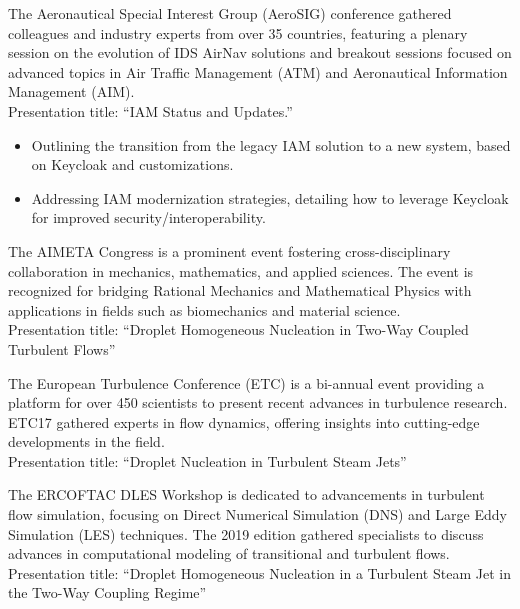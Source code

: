 	\newline
	The Aeronautical Special Interest Group (AeroSIG) conference gathered colleagues and industry experts from over 35 countries, featuring a plenary session on the evolution of IDS AirNav solutions and breakout sessions focused on advanced topics in Air Traffic Management (ATM) and Aeronautical Information Management (AIM). \\
	\medskip
	Presentation title: ``IAM Status and Updates.'' \\
	\smallskip
	\begin{itemize}
		\item Outlining the transition from the legacy IAM solution to a new system, based on Keycloak and customizations.
		\item Addressing IAM modernization strategies, detailing how to leverage Keycloak for improved security/interoperability.
	\end{itemize}

	\divider

	\newline
	The AIMETA Congress is a prominent event fostering cross-disciplinary collaboration in mechanics, mathematics, and applied sciences. The event is recognized for bridging Rational Mechanics and Mathematical Physics with applications in fields such as biomechanics and material science. \\
	\medskip
	Presentation title: ``Droplet Homogeneous Nucleation in Two-Way Coupled Turbulent Flows''

	\newpage
	\divider

	The European Turbulence Conference (ETC) is a bi-annual event providing a platform for over 450 scientists to present recent advances in turbulence research. ETC17 gathered experts in flow dynamics, offering insights into cutting-edge developments in the field. \\
	\medskip
	Presentation title: ``Droplet Nucleation in Turbulent Steam Jets''

	\divider

	The ERCOFTAC DLES Workshop is dedicated to advancements in turbulent flow simulation, focusing on Direct Numerical Simulation (DNS) and Large Eddy Simulation (LES) techniques. The 2019 edition gathered specialists to discuss advances in computational modeling of transitional and turbulent flows. \\
	\medskip
	Presentation title: ``Droplet Homogeneous Nucleation in a Turbulent Steam Jet in the Two-Way Coupling Regime''

